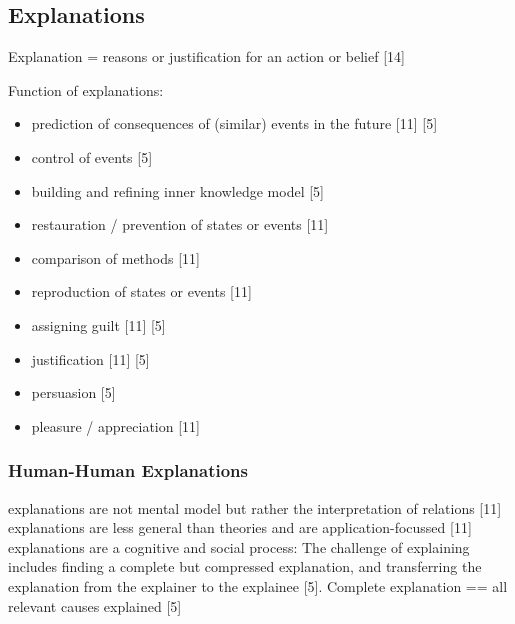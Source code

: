 \subsection{Explanations}
Explanation = reasons or justification for an action or belief [14]\newline

Function of explanations:\newline
\begin{itemize}
	\item prediction of consequences of (similar) events in the future [11] [5]
	\item control of events  [5]
	\item building and refining inner knowledge model [5]
	\item restauration / prevention of states or events [11]
	\item comparison of methods [11]
	\item reproduction of states or events [11]
	\item assigning guilt [11] [5]
	\item justification [11] [5]
	\item persuasion [5]
	\item pleasure / appreciation [11]
\end{itemize}

\subsubsection{Human-Human Explanations}
explanations are not mental model but rather the interpretation of relations [11]\newline
explanations are less general than theories and are application-focussed [11] \newline
explanations are a cognitive and social process: The challenge of explaining includes finding a complete but compressed explanation, and transferring the explanation from the explainer to the explainee [5].\newline
Complete explanation == all relevant causes explained [5] \newline

